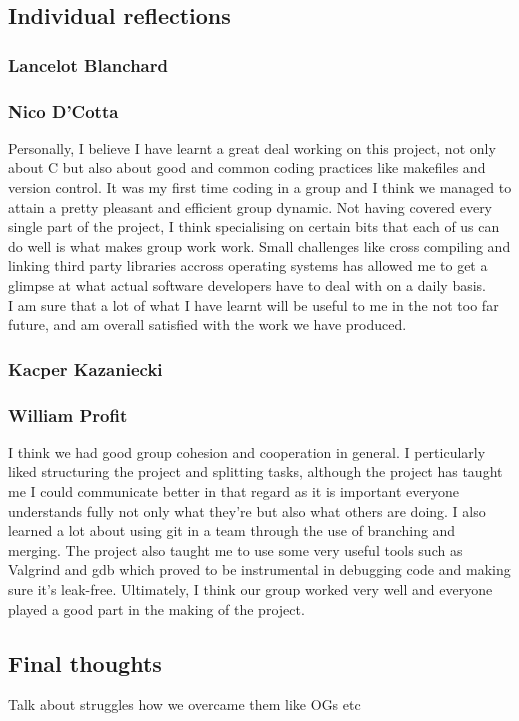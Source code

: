\documentclass[11pt]{article}
\begin{document}
\subsection{Individual reflections}
\subsubsection{Lancelot Blanchard}
\subsubsection{Nico D'Cotta}
Personally, I believe I have learnt a great deal working on this project, not
only about C but also about good and common coding practices like makefiles and
version control.
It was my first time coding in a group and I think we managed to attain a pretty
pleasant and efficient group dynamic. Not having covered every single part of
the project, I think specialising on certain bits that each of us can do well is
what makes group work work. Small challenges like cross compiling and linking
third party libraries accross operating systems has allowed me to get a glimpse
at what actual software developers have to deal with on a daily basis. \\
I am sure that a lot of what I have learnt will be useful to me in the not too
far future, and am overall satisfied with the work we have produced.


\subsubsection{Kacper Kazaniecki}
\subsubsection{William Profit}
I think we had good group cohesion and cooperation in general. I perticularly
liked structuring the project and splitting tasks, although the project has
taught me I could communicate better in that regard as it is important everyone
understands fully not only what they're but also what others are doing. I also
learned a lot about using git in a team through the use of branching and
merging. The project also taught me to use some very useful tools such as
Valgrind and gdb which proved to be instrumental in debugging code and making
sure it's leak-free. Ultimately, I think our group worked very well and everyone
played a good part in the making of the project.

\subsection{Final thoughts}
Talk about struggles how we overcame them like OGs etc
\end{document}
